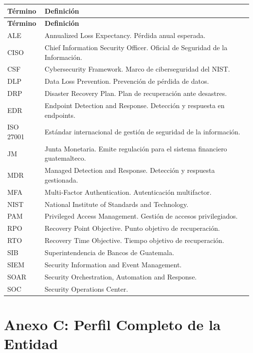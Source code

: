 \documentclass[11pt,a4paper]{article}
\begin{document}
	\begin{longtable}{@{}p{2.5cm}p{12.5cm}@{}}
		\toprule
		\textbf{Término} & \textbf{Definición} \\ \midrule
		\endfirsthead
		\toprule
		\textbf{Término} & \textbf{Definición} \\ \midrule
		\endhead
		ALE & Annualized Loss Expectancy. Pérdida anual esperada. \\
		CISO & Chief Information Security Officer. Oficial de Seguridad de la Información. \\
		CSF & Cybersecurity Framework. Marco de ciberseguridad del NIST. \\
		DLP & Data Loss Prevention. Prevención de pérdida de datos. \\
		DRP & Disaster Recovery Plan. Plan de recuperación ante desastres. \\
		EDR & Endpoint Detection and Response. Detección y respuesta en endpoints. \\
		ISO 27001 & Estándar internacional de gestión de seguridad de la información. \\
		JM & Junta Monetaria. Emite regulación para el sistema financiero guatemalteco. \\
		MDR & Managed Detection and Response. Detección y respuesta gestionada. \\
		MFA & Multi-Factor Authentication. Autenticación multifactor. \\
		NIST & National Institute of Standards and Technology. \\
		PAM & Privileged Access Management. Gestión de accesos privilegiados. \\
		RPO & Recovery Point Objective. Punto objetivo de recuperación. \\
		RTO & Recovery Time Objective. Tiempo objetivo de recuperación. \\
		SIB & Superintendencia de Bancos de Guatemala. \\
		SIEM & Security Information and Event Management. \\
		SOAR & Security Orchestration, Automation and Response. \\
		SOC & Security Operations Center. \\
		\bottomrule
	\end{longtable}
	
	\newpage
	
	\section{Anexo C: Perfil Completo de la Entidad}
	
\end{document}
